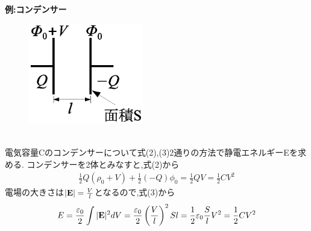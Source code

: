 \documentclass[../main]{subfiles}
\begin{document}
\\
{\bf 例:コンデンサー} \\
\begin{figure}[h]
 \begin{center}
  \includegraphics[width=50mm]{6.1.eps}
 \end{center}
 \caption{}
 \label{fig:one}
\end{figure}
\\
電気容量Cのコンデンサーについて式(2),(3)2通りの方法で静電エネルギーEを求める.
コンデンサーを2体とみなすと,式(2)から
\begin{eqnarray*}
\frac{1}{2}Q(\rho_0 + V) + \frac{1}{2}(-Q)\phi_0 = \frac{1}{2}QV = \frac{1}{2}CV^2
\end{eqnarray*}
電場の大きさは$|{\bf E}|=\frac{V}{l}$となるので,式(3)から
\begin{eqnarray*}
E = \frac{\varepsilon_0}{2} \int |{\bf E}|^2 dV 
= \frac{\varepsilon_0}{2} \left( \frac{V}{l} \right)^2 Sl = \frac{1}{2}\varepsilon_0 \frac{S}{l}V^2 = \frac{1}{2}CV^2
\end{eqnarray*}
\end{document}
